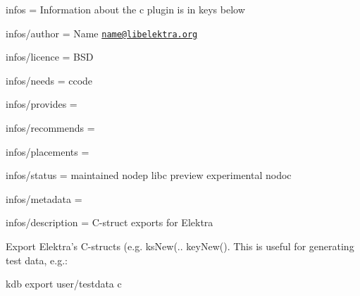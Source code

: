 
\begin{DoxyItemize}
\item infos = Information about the c plugin is in keys below
\item infos/author = Name \href{mailto:name@libelektra.org}{\tt name@libelektra.\+org}
\item infos/licence = B\+S\+D
\item infos/needs = ccode
\item infos/provides =
\item infos/recommends =
\item infos/placements =
\item infos/status = maintained nodep libc preview experimental nodoc
\item infos/metadata =
\item infos/description = C-\/struct exports for Elektra
\end{DoxyItemize}

Export Elektra's C-\/structs (e.\+g. {\ttfamily ks\+New(.. key\+New(}). This is useful for generating test data, e.\+g.\+: \begin{DoxyVerb}    kdb export user/testdata c\end{DoxyVerb}
 